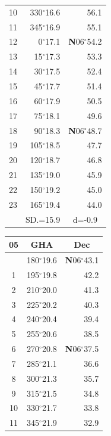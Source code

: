 \documentclass[10pt, a4paper]{report}
\begin{document}
\begin{scriptsize}
\begin{tabular*}{0.2\textwidth}[t]{@{\extracolsep{\fill}}|c|rr|}
10 & 330$^\circ$16.6 & 56.1\\
11 & 345$^\circ$16.9 & 55.1\\[2Pt]
12 & 0$^\circ$17.1 & \textbf{N}06$^\circ$54.2\\
13 & 15$^\circ$17.3 & 53.3\\
14 & 30$^\circ$17.5 & 52.4\\
15 & 45$^\circ$17.7 & \raisebox{0.24ex}{\boldmath$\cdot$~\boldmath$\cdot$~~}51.4\\
16 & 60$^\circ$17.9 & 50.5\\
17 & 75$^\circ$18.1 & 49.6\\[2Pt]
18 & 90$^\circ$18.3 & \textbf{N}06$^\circ$48.7\\
19 & 105$^\circ$18.5 & 47.7\\
20 & 120$^\circ$18.7 & 46.8\\
21 & 135$^\circ$19.0 & \raisebox{0.24ex}{\boldmath$\cdot$~\boldmath$\cdot$~~}45.9\\
22 & 150$^\circ$19.2 & 45.0\\
23 & 165$^\circ$19.4 & 44.0\\
\hline
\rule{0pt}{2.4ex} & \multicolumn{1}{c}{SD.=15.9} & \multicolumn{1}{c|}{d=-0.9}\\
\hline
\end{tabular*}\noindent
\begin{tabular*}{0.2\textwidth}[t]{@{\extracolsep{\fill}}|c|rr|}
\hline
\multicolumn{1}{|c|}{\rule{0pt}{2.6ex}\textbf{05}} & \multicolumn{1}{c}{\textbf{GHA}} & \multicolumn{1}{c|}{\textbf{Dec}}\\
\hline\rule{0pt}{2.6ex}\noindent
0 & 180$^\circ$19.6 & \textbf{N}06$^\circ$43.1\\
1 & 195$^\circ$19.8 & 42.2\\
2 & 210$^\circ$20.0 & 41.3\\
3 & 225$^\circ$20.2 & \raisebox{0.24ex}{\boldmath$\cdot$~\boldmath$\cdot$~~}40.3\\
4 & 240$^\circ$20.4 & 39.4\\
5 & 255$^\circ$20.6 & 38.5\\[2Pt]
6 & 270$^\circ$20.8 & \textbf{N}06$^\circ$37.5\\
7 & 285$^\circ$21.1 & 36.6\\
8 & 300$^\circ$21.3 & 35.7\\
9 & 315$^\circ$21.5 & \raisebox{0.24ex}{\boldmath$\cdot$~\boldmath$\cdot$~~}34.8\\
10 & 330$^\circ$21.7 & 33.8\\
11 & 345$^\circ$21.9 & 32.9\\[2Pt]

\end{tabular*}
\end{scriptsize}
\end{document}
